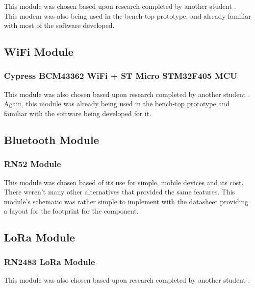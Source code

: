 	This module was chosen based upon research completed by another student \cite{Puranikthesis:report}. 
This modem was also being used in the bench-top prototype, and already familiar with most of the software developed. 

\subsection{WiFi Module}
\subsubsection{Cypress BCM43362 WiFi + ST Micro STM32F405 MCU}
		This module was also chosen based upon research completed by another student \cite{Puranikthesis:report}.
Again, this module was already being used in the bench-top prototype and familiar with the software being developed for it. 


\subsection{Bluetooth Module}
\subsubsection{RN52 Module}
	This module was chosen based of its use for simple, mobile devices and its cost. 
There weren't many other alternatives that provided the same features. 
This module's schematic was rather simple to implement with the datasheet providing a layout for the footprint for the component.


\subsection{LoRa Module}
\subsubsection{RN2483 LoRa Module}
	This module was also chosen based upon research completed by another student \cite{Puranikthesis:report}. 

